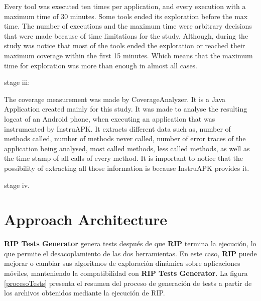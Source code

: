 Every tool was executed ten times per application, and every execution with a maximum time of 30 minutes. Some tools ended its exploration before the max time. 
The number of executions and the maximum time were arbitrary decisions that were made because of time limitations for the study. Although, during the study was notice that most of the tools ended the exploration or reached their maximum coverage within the first 15 minutes. Which means that the maximum time for exploration was more than enough in almost all cases. 
 
stage iii: 

The coverage measurement was made by CoverageAnalyzer. It is a Java Application created mainly for this study. It was made to analyse the resulting logcat of an Android phone, when executing an application that was instrumented by InstruAPK. It extracts different data such as, number of methods called, number of  methods never called, number of error traces of the application being analysed, most called methods, less called methods, as well as the time stamp of all calls of every method. It is important to notice that the possibility of extracting all those information is because InstruAPK provides it.

stage iv. 


\section{Approach Architecture}

\textbf{RIP Tests Generator} genera tests después de que \textbf{RIP} termina la ejecución, lo que permite el desacoplamiento de las dos herramientas. En este caso, \textbf{RIP} \cite{LinanAutomatedApps} puede mejorar o cambiar sus algoritmos de exploración dinámica sobre aplicaciones móviles, manteniendo la compatibilidad con \textbf{RIP Tests Generator}. La figura \ref{procesoTests} presenta el resumen del proceso de generación de tests a partir de los archivos obtenidos mediante la ejecución de RIP.

